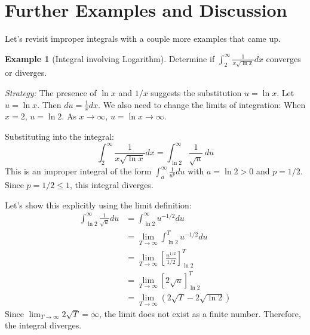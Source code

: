 \documentclass[11pt]{article}
\theoremstyle{definition}
\newtheorem{example}[theorem]{Example}
\theoremstyle{remark}
\begin{document}
\section{Further Examples and Discussion}

Let's revisit improper integrals with a couple more examples that came up.

\begin{example}[Integral involving Logarithm] \label{ex:ln_integral}
Determine if $\int_2^\infty \frac{1}{x \sqrt{\ln x}} dx$ converges or diverges.

\textit{Strategy:} The presence of $\ln x$ and $1/x$ suggests the substitution $u = \ln x$.
Let $u = \ln x$. Then $du = \frac{1}{x} dx$.
We also need to change the limits of integration:
When $x=2$, $u = \ln 2$.
As $x \to \infty$, $u = \ln x \to \infty$.

Substituting into the integral:
\[ \int_2^\infty \frac{1}{x \sqrt{\ln x}} dx = \int_{\ln 2}^\infty \frac{1}{\sqrt{u}} \, du \]
This is an improper integral of the form $\int_a^\infty \frac{1}{u^p} du$ with $a = \ln 2 > 0$ and $p = 1/2$.
Since $p = 1/2 \le 1$, this integral diverges.

Let's show this explicitly using the limit definition:
\begin{align*} \int_{\ln 2}^\infty \frac{1}{\sqrt{u}} du &= \int_{\ln 2}^\infty u^{-1/2} du \\ &= \lim_{T \to \infty} \int_{\ln 2}^T u^{-1/2} du \\ &= \lim_{T \to \infty} \left[ \frac{u^{1/2}}{1/2} \right]_{\ln 2}^T \\ &= \lim_{T \to \infty} [2\sqrt{u}]_{\ln 2}^T \\ &= \lim_{T \to \infty} (2\sqrt{T} - 2\sqrt{\ln 2}) \end{align*}
Since $\lim_{T \to \infty} 2\sqrt{T} = \infty$, the limit does not exist as a finite number.
Therefore, the integral diverges.
\end{example}
\end{document}
